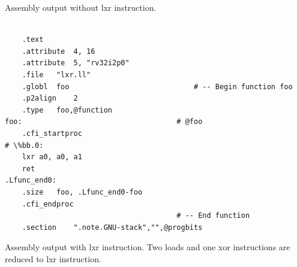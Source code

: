 Assembly output without lxr instruction.
\\\\


\begin{lstlisting}
    .text
	.attribute	4, 16
	.attribute	5, "rv32i2p0"
	.file	"lxr.ll"
	.globl	foo                             # -- Begin function foo
	.p2align	2
	.type	foo,@function
foo:                                    # @foo
	.cfi_startproc
# \%bb.0:
	lxr	a0, a0, a1
	ret
.Lfunc_end0:
	.size	foo, .Lfunc_end0-foo
	.cfi_endproc
                                        # -- End function
	.section	".note.GNU-stack","",@progbits
\end{lstlisting}

Assembly output with lxr instruction. Two loads and one xor instructions are reduced to lxr instruction.
\\\\
